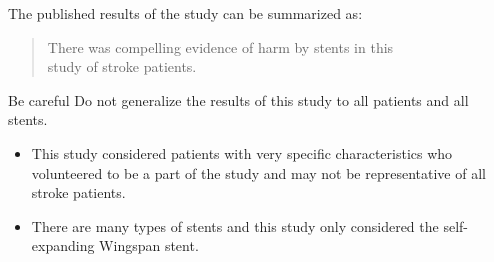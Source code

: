 \documentclass{beamer}
\begin{document}
\begin{frame}
\begin{note}
The published results of the study can be summarized as:
\blockquote{There was compelling evidence of harm by stents in this\\ study of stroke patients.}

\vspace{-3mm}
\end{note}\pause

\begin{block}{Be careful}
Do not generalize the results of this study to all patients and all stents.\pause

\begin{itemize}
\item This study considered patients with very specific characteristics who volunteered to be a part of the study and may not be representative of all stroke patients.\pause
\item There are many types of stents and this study only considered the self-expanding Wingspan stent.
\end{itemize}
\end{block}
\end{frame}
\end{document}
